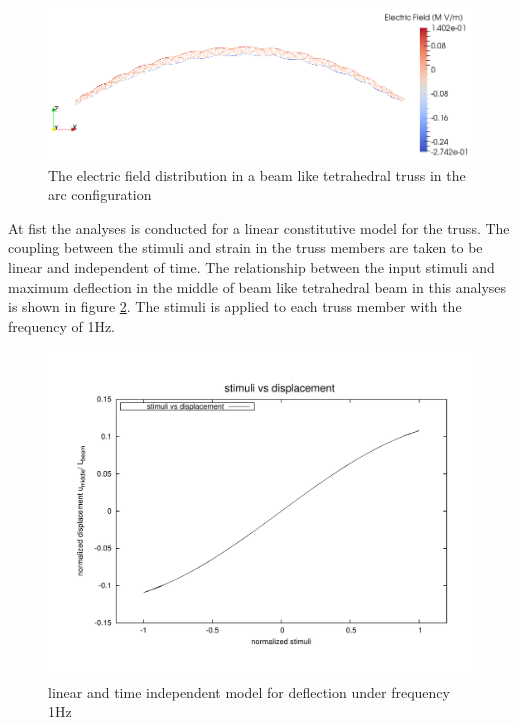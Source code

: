 \begin{figure} 
\centering
\includegraphics[width=5.0in]{./chap_5_active_trusses/images_non_linear_time_dependent_constitutive_equatio/linear_tetrahedral_bending_electric_field_contour.png}
\caption{The electric field distribution in a beam like tetrahedral truss in the arc configuration}
\label{fig:linear_tetrahedral_bending_efield_contour}
\end{figure} 

At fist the analyses is conducted for a linear constitutive model for the truss.
The coupling between the stimuli and strain in the truss members are taken to be linear and independent of time.
The relationship between the input stimuli and maximum deflection in the middle of beam like tetrahedral beam in this analyses is shown in figure \ref{fig:linear_static_stimuli_vs_displacement}.
The stimuli is applied to each truss member with the frequency of 1Hz.

\begin{figure} 
\centering
\includegraphics[width=5.0in]{./chap_5_active_trusses/images_non_linear_time_dependent_constitutive_equatio/linear_static_stimuli_vs_displacement.pdf}
\caption{linear and time independent model for deflection under frequency 1Hz}
\label{fig:linear_static_stimuli_vs_displacement}
\end{figure} 

